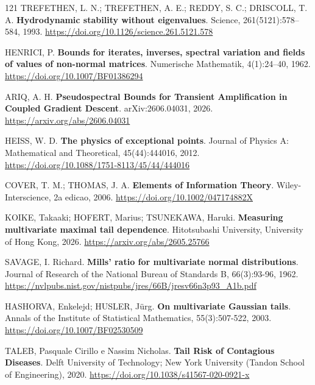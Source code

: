 \begin{thebibliography}{121}
  TREFETHEN, L. N.; TREFETHEN, A. E.; REDDY, S. C.; DRISCOLL, T. A.
  \newblock \textbf{Hydrodynamic stability without eigenvalues}.
  \newblock Science, 261(5121):578--584, 1993.
  \newblock \url{https://doi.org/10.1126/science.261.5121.578}

  HENRICI, P.
  \newblock \textbf{Bounds for iterates, inverses, spectral variation and fields of values of non-normal matrices}.
  \newblock Numerische Mathematik, 4(1):24--40, 1962.
  \newblock \url{https://doi.org/10.1007/BF01386294}

  ARIQ, A. H.
  \newblock \textbf{Pseudospectral Bounds for Transient Amplification in Coupled Gradient Descent}.
  \newblock arXiv:2606.04031, 2026.
  \newblock \url{https://arxiv.org/abs/2606.04031}

  HEISS, W. D.
  \newblock \textbf{The physics of exceptional points}.
  \newblock Journal of Physics A: Mathematical and Theoretical, 45(44):444016, 2012.
  \newblock \url{https://doi.org/10.1088/1751-8113/45/44/444016}

  COVER, T. M.; THOMAS, J. A.
  \newblock \textbf{Elements of Information Theory}.
  \newblock Wiley-Interscience, 2a edicao, 2006.
  \newblock \url{https://doi.org/10.1002/047174882X}

  KOIKE, Takaaki; HOFERT, Marius; TSUNEKAWA, Haruki.
  \newblock \textbf{Measuring multivariate maximal tail dependence}.
  \newblock Hitotsubashi University, University of Hong Kong, 2026.
  \newblock \url{https://arxiv.org/abs/2605.25766}

  SAVAGE, I. Richard.
  \newblock \textbf{Mills' ratio for multivariate normal distributions}.
  \newblock Journal of Research of the National Bureau of Standards B, 66(3):93-96, 1962.
  \newblock \url{https://nvlpubs.nist.gov/nistpubs/jres/66B/jresv66n3p93_A1b.pdf}

  HASHORVA, Enkelejd; HUSLER, Jürg.
  \newblock \textbf{On multivariate Gaussian tails}.
  \newblock Annals of the Institute of Statistical Mathematics, 55(3):507-522, 2003.
  \newblock \url{https://doi.org/10.1007/BF02530509}

  TALEB, Pasquale Cirillo e Nassim Nicholas.
  \newblock \textbf{Tail Risk of Contagious Diseases}.
  \newblock Delft University of Technology; New York University (Tandon School of Engineering), 2020.
  \newblock \url{https://doi.org/10.1038/s41567-020-0921-x}


\end{thebibliography}
